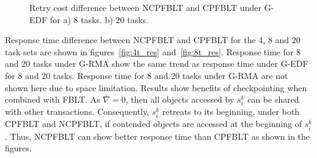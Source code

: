 \documentclass[conference]{IEEEtran}
\begin{document}
\begin{figure}
\centering
{}
%
\begin{comment}
\subfigure[8 tasks, G-RMA, Retry cost]{
\scalebox{0.75}{
}
\label{fig:8t_grma_rc}
}
\end{comment}
\caption{Retry cost difference between NCPFBLT and CPFBLT under G-EDF for a) 8 tasks. b) 20 tasks.}
\label{fig:8t_rc}
\end{figure}
%
\begin{comment}
\begin{figure}
\centering
\subfigure[20 tasks, G-EDF, Retry cost]{
\scalebox{0.75}{
}
\label{fig:20t_gedf_rc}
}
\subfigure[20 tasks, G-RMA, Retry cost]{
\scalebox{0.75}{
}
\label{fig:20t_grma_rc}
}
\caption{Retry cost difference between NCPFBLT and CPFBLT for 20 tasks.}
\label{fig:20t_rc}
\end{figure}
\end{comment}
%
Response time difference between NCPFBLT and CPFBLT for the 4, 8 and 20 task sets are shown in figures~\ref{fig:4t_res} and~\ref{fig:8t_res}. Response time for 8 and 20 tasks under G-RMA show the same trend as response time under G-EDF for 8 and 20 tasks. Response time for 8 and 20 tasks under G-RMA are not shown here due to space limitation. Results show benefits of checkpointing when combined with FBLT. As $\bar{\nabla}=0$, then all objects accessed by $s_i^k$ can be shared with other transactions. Consequently, $s_i^k$ retreats to its beginning, under both CPFBLT and NCPFBLT, if contended objects are accessed at the beginning of $s_i^k$. Thus, NCPFBLT can show better response time than CPFBLT as shown in the figures.
\end{document}
